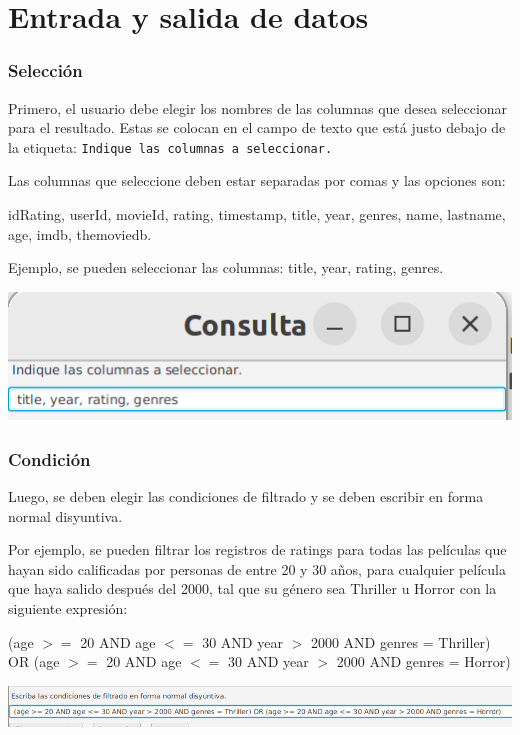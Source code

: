 \documentclass{beamer}
\begin{document}
\section{Entrada y salida de datos}

\begin{frame}
\frametitle{Selección}

Primero, el usuario debe elegir los nombres de las columnas que desea seleccionar para el resultado. Estas se colocan en el campo de texto que está justo debajo de la etiqueta: \texttt{Indique las columnas a seleccionar.}

Las columnas que seleccione deben estar separadas por comas y las opciones son:

idRating, userId, movieId, rating, timestamp, title, year, genres, name, lastname, age, imdb, themoviedb.

\pause

Ejemplo, se pueden seleccionar las columnas: title, year, rating, genres.

\begin{center}
\includegraphics[scale=0.5]{seleccion}
\end{center}

\end{frame}

\begin{frame}
\frametitle{Condición}

Luego, se deben elegir las condiciones de filtrado y se deben escribir en forma normal disyuntiva.

Por ejemplo, se pueden filtrar los registros de ratings para todas las películas que hayan sido calificadas por personas de entre 20 y 30 años, para cualquier película que haya salido después del 2000, tal que su género sea Thriller u Horror con la siguiente expresión:

\pause

(age $>=$ 20 AND age $<=$ 30 AND year $>$ 2000 AND genres = Thriller) OR (age $>=$ 20 AND age $<=$ 30 AND year $>$ 2000 AND genres = Horror)

\begin{center}
\includegraphics[scale=0.3]{condicion}
\end{center}

\end{frame}
\end{document}
